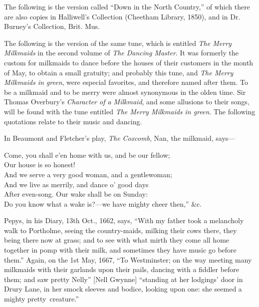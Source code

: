 The following is the version called “Down in the North Country,” of which
there are also copies in Halliwell’s Collection (Cheetham Library, 1850), and in
Dr. Burney’s Collection, Brit. Mus.
\pagebreak




The following is the version of the same tune, which is entitled \textit{The Merry Milkmaids}
in the second volume of \textit{The Dancing Master}. It was formerly the custom
for milkmaids to dance before the houses of their customers in the month of May,
to obtain a small gratuity; and probably this tune, and \textit{The Merry Milkmaids in
green}, were especial favorites, and therefore named after them. To be a milkmaid
and to be merry were almost synonymous in the olden time. Sir Thomas
Overbury’s \textit{Character of a Milkmaid}, and some allusions to their songs, will be
found with the tune entitled \textit{The Merry Milkmaids in green}. The following
quotations relate to their music and dancing.

In Beaumont and Fletcher’s play, \textit{The Coxcomb}, Nan, the milkmaid, says—
\settowidth{\versewidth}{And we serve a very good woman, and a gentlewoman;}
\begin{scverse}Come, you shall e’en home with us, and be our fellow;\\
Our house is so honest!\\
And we serve a very good woman, and a gentlewoman;\\
And we live as merrily, and dance o’ good days\\
After even-song. Our wake shall be on Sunday:\\
Do you know what a wake is?—we have mighty cheer then,” \&c.
\end{scverse}

Pepys, in his Diary, 13th Oct., 1662, says, “With my father took a melancholy
walk to Portholme, seeing the country-maids, milking their cows there,
they being there now at grass; and to see with what mirth they come all home
together in pomp with their milk, and sometimes they have music go before them.”
\pagebreak
Again, on the 1st May, 1667, “To Westminster; on the way meeting many
milkmaids with their garlands upon their pails, dancing with a fiddler before
them; and saw pretty Nelly” [Nell Gwynne] “standing at her lodgings’ door in
Drury Lane, in her smock sleeves and bodice, looking upon one: she seemed a
mighty pretty~creature.”

